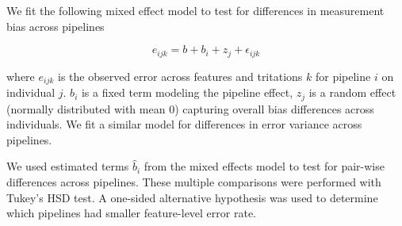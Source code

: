 \documentclass{bmcart}
\begin{document}
We fit the following mixed effect model to test for differences in measurement bias across pipelines

$$
e_{ijk} = b + b_i + z_j + \epsilon_{ijk}
$$

where $e_{ijk}$ is the observed error across features and tritations $k$ for pipeline $i$ on individual $j$. $b_i$ is a fixed term modeling the pipeline effect, $z_j$ is a random effect (normally distributed with mean 0) capturing overall bias differences across individuals. We fit a similar model for differences in error variance across pipelines.

We used estimated terms $\hat{b}_i$ from the mixed effects model to test for pair-wise differences across pipelines.
These multiple comparisons were performed with Tukey's HSD test. A one-sided
alternative hypothesis was used to determine which pipelines had smaller
feature-level error rate.

\end{document}
